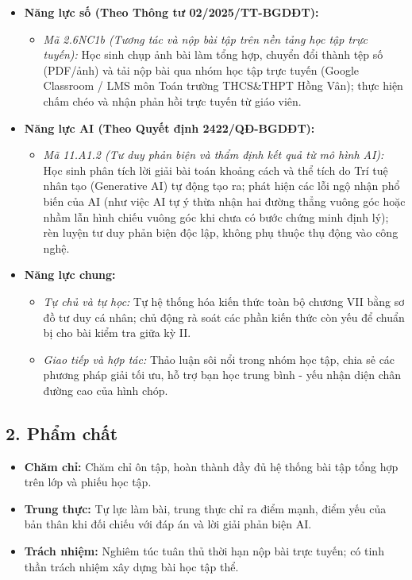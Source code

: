 \documentclass[12pt, a4paper]{article}
\begin{document}
\begin{itemize}[leftmargin=1.2cm]
    \item \textbf{Năng lực số (Theo Thông tư 02/2025/TT-BGDĐT):}
    \begin{itemize}[leftmargin=0.6cm]
        \item \textit{Mã 2.6NC1b (Tương tác và nộp bài tập trên nền tảng học tập trực tuyến):} Học sinh chụp ảnh bài làm tổng hợp, chuyển đổi thành tệp số (PDF/ảnh) và tải nộp bài qua nhóm học tập trực tuyến (Google Classroom / LMS môn Toán trường THCS\&THPT Hồng Vân); thực hiện chấm chéo và nhận phản hồi trực tuyến từ giáo viên.
    \end{itemize}

    \item \textbf{Năng lực AI (Theo Quyết định 2422/QĐ-BGDĐT):}
    \begin{itemize}[leftmargin=0.6cm]
        \item \textit{Mã 11.A1.2 (Tư duy phản biện và thẩm định kết quả từ mô hình AI):} Học sinh phân tích lời giải bài toán khoảng cách và thể tích do Trí tuệ nhân tạo (Generative AI) tự động tạo ra; phát hiện các lỗi ngộ nhận phổ biến của AI (như việc AI tự ý thừa nhận hai đường thẳng vuông góc hoặc nhầm lẫn hình chiếu vuông góc khi chưa có bước chứng minh định lý); rèn luyện tư duy phản biện độc lập, không phụ thuộc thụ động vào công nghệ.
    \end{itemize}

    \item \textbf{Năng lực chung:}
    \begin{itemize}[leftmargin=0.6cm]
        \item \textit{Tự chủ và tự học:} Tự hệ thống hóa kiến thức toàn bộ chương VII bằng sơ đồ tư duy cá nhân; chủ động rà soát các phần kiến thức còn yếu để chuẩn bị cho bài kiểm tra giữa kỳ II.
        \item \textit{Giao tiếp và hợp tác:} Thảo luận sôi nổi trong nhóm học tập, chia sẻ các phương pháp giải tối ưu, hỗ trợ bạn học trung bình - yếu nhận diện chân đường cao của hình chóp.
    \end{itemize}
\end{itemize}

\subsection*{2. Phẩm chất}

\begin{itemize}[leftmargin=1.2cm]
    \item \textbf{Chăm chỉ:} Chăm chỉ ôn tập, hoàn thành đầy đủ hệ thống bài tập tổng hợp trên lớp và phiếu học tập.
    \item \textbf{Trung thực:} Tự lực làm bài, trung thực chỉ ra điểm mạnh, điểm yếu của bản thân khi đối chiếu với đáp án và lời giải phản biện AI.
    \item \textbf{Trách nhiệm:} Nghiêm túc tuân thủ thời hạn nộp bài trực tuyến; có tinh thần trách nhiệm xây dựng bài học tập thể.
\end{itemize}
\end{document}
